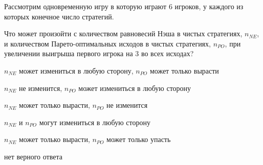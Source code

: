 
\begin{question}
Рассмотрим одновременную игру в которую играют 6 игроков, у каждого из
которых конечное число стратегий.

Что может произойти с количеством равновесий Нэша в чистых стратегиях,
\(n_{NE}\), и количеством Парето-оптимальных исходов в чистых
стратегиях, \(n_{PO}\), при увеличении выигрыша первого игрока на 3 во
всех исходах?
\begin{answerlist}
  \item \(n_{NE}\) может измениться в любую сторону, \(n_{PO}\) может только
вырасти
  \item \(n_{NE}\) не изменится, \(n_{PO}\) может измениться в любую сторону
  \item \(n_{NE}\) может только вырасти, \(n_{PO}\) не изменится
  \item \(n_{NE}\) и \(n_{PO}\) могут измениться в любую сторону
  \item \(n_{NE}\) может только вырасти, \(n_{PO}\) может только упасть
  \item нет верного ответа
\end{answerlist}
\end{question}


